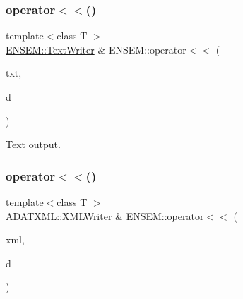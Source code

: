 \mbox{\label{group__obsscalar_gaa7ba73cd5fa56a8fc62b9f9297fbef31}} 
\subsubsection{\texorpdfstring{operator$<$$<$()}{operator<<()}\hspace{0.1cm}{\footnotesize\ttfamily [2/4]}}
{\footnotesize\ttfamily template$<$class T $>$ \\
\mbox{\hyperlink{classENSEM_1_1TextWriter}{E\+N\+S\+E\+M\+::\+Text\+Writer}} \& E\+N\+S\+E\+M\+::operator$<$$<$ (\begin{DoxyParamCaption}\item[{\mbox{\hyperlink{classENSEM_1_1TextWriter}{E\+N\+S\+E\+M\+::\+Text\+Writer}} \&}]{txt,  }\item[{const \mbox{\hyperlink{classENSEM_1_1OScalar}{O\+Scalar}}$<$ T $>$ \&}]{d }\end{DoxyParamCaption})\hspace{0.3cm}{\ttfamily [inline]}}



Text output. 

\mbox{\label{group__obsscalar_ga2eb6bed5bd0b7f67a0a0641033b3a120}} 
\subsubsection{\texorpdfstring{operator$<$$<$()}{operator<<()}\hspace{0.1cm}{\footnotesize\ttfamily [3/4]}}
{\footnotesize\ttfamily template$<$class T $>$ \\
\mbox{\hyperlink{classADATXML_1_1XMLWriter}{A\+D\+A\+T\+X\+M\+L\+::\+X\+M\+L\+Writer}} \& E\+N\+S\+E\+M\+::operator$<$$<$ (\begin{DoxyParamCaption}\item[{\mbox{\hyperlink{classADATXML_1_1XMLWriter}{A\+D\+A\+T\+X\+M\+L\+::\+X\+M\+L\+Writer}} \&}]{xml,  }\item[{const \mbox{\hyperlink{classENSEM_1_1OScalar}{O\+Scalar}}$<$ T $>$ \&}]{d }\end{DoxyParamCaption})\hspace{0.3cm}{\ttfamily [inline]}}



